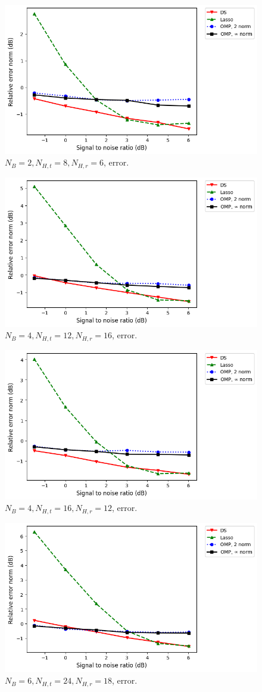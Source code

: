 \documentclass[journal]{IEEEtran}
\newcommand {\m} [1] {\( #1 \)}
\begin{document}
\begin {figure} [H]
\includegraphics [width = 0.45 \textwidth]
{error-small-more-wide-six-usual.png}
\caption {\m {N_B = 2, N_{H,t} = 8, N_{H,r} = 6}, error.}
\end {figure}

\begin {figure} [H]
\includegraphics [width = 0.45 \textwidth]
{error-medium-more-tall-six-usual.png}
\caption {\m {N_B = 4, N_{H,t} = 12, N_{H,r} = 16}, error.}
\end {figure}

\begin {figure} [H]
\includegraphics [width = 0.45 \textwidth]
{error-medium-more-wide-six-usual.png}
\caption {\m {N_B = 4, N_{H,t} = 16, N_{H,r} = 12}, error.}
\end {figure}

\begin {figure} [H]
\includegraphics [width = 0.45 \textwidth]
{error-big-more-tall-six-usual.png}
\caption {\m {N_B = 6, N_{H,t} = 24, N_{H,r} = 18}, error.}
\end {figure}
\end{document}
